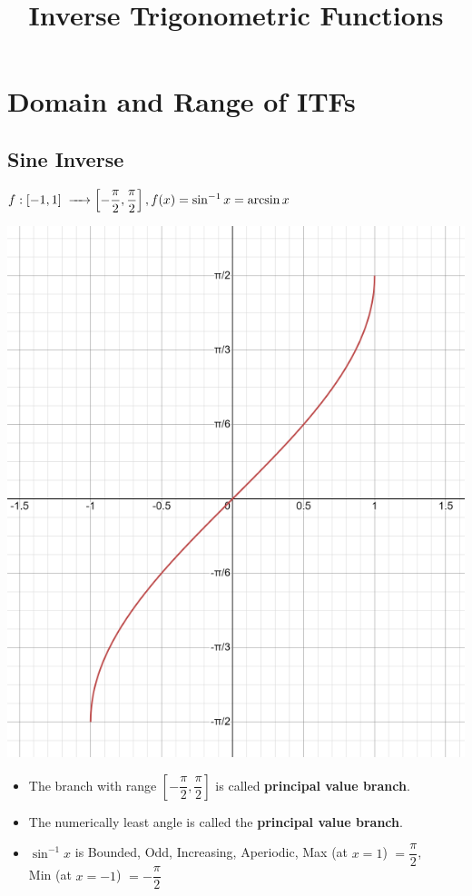 \documentclass{article}
\title{Inverse Trigonometric Functions}
\author{}
\date{}
\begin{document}
\maketitle

\section{Domain and Range of ITFs}

\subsection{Sine Inverse}

$f : [-1,1] \hspace{1mm} \xrightarrow{\hspace{4mm}} \left[-\dfrac{\pi}{2}, \dfrac{\pi}{2}\right], f(x)=\sin^{-1} x = \arcsin x$
\begin{center}
    
\includegraphics[scale=0.6]{graph_1.png}
\end{center}

\begin{itemize}
    \item The branch with range $\left[-\dfrac{\pi}{2}, \dfrac{\pi}{2}\right]$ is called \textbf{principal value branch}.
    \item The numerically least angle is called the \textbf{principal value branch}.
    \item $\sin^{-1} x$ is Bounded, Odd, Increasing, Aperiodic, Max (at $x=1$) $=\dfrac{\pi}{2}$, 
    \\Min (at $x=-1$) $=-\dfrac{\pi}{2}$ 
\end{itemize}
\end{document}
